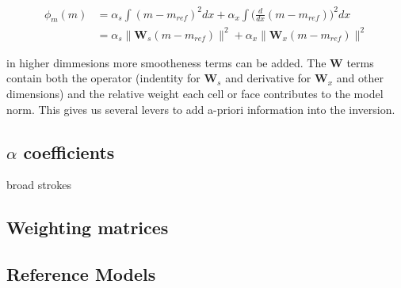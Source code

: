 \begin{align}
\phi_m(m) &= \alpha_s\int(m-m_{ref})^2dx+\alpha_x\int\bigg(\frac{d}{dx}(m-m_{ref})\bigg)^2dx\\
&=\alpha_s\|\textbf{W}_s(m-m_{ref})\|^2+\alpha_x\|\textbf{W}_x(m-m_{ref})\|^2
\end{align}

in higher dimmesions more smootheness terms can be added. The $\textbf{W}$ terms contain both the operator (indentity for $\textbf{W}_s$ and derivative for $\textbf{W}_x$ and other dimensions) and the relative weight each cell or face contributes to the model norm. This gives us several levers to add a-priori information into the inversion.

\subsection{$\alpha$ coefficients}
\label{alpha coefficients}

broad strokes

\subsection{Weighting matrices}
\label{Weighting matrices}

\subsection{Reference Models}
\label{Reference Models}

\endinput

Any text after an \endinput is ignored.
You could put scraps here or things in progress.
